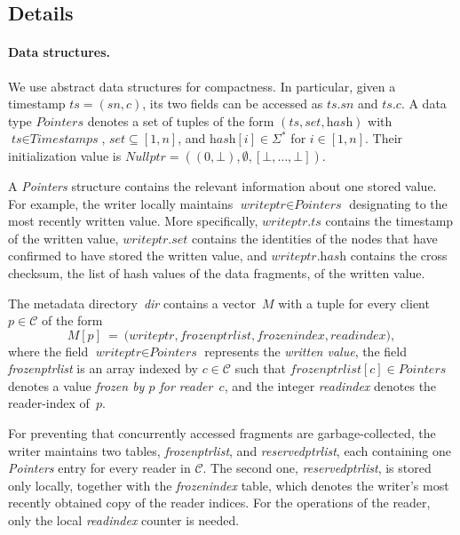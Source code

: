 \documentclass[oribibl]{llncs}
\theoremstyle{definition-boldhead}
\newcommand{\var}[1]{\textit{#1}}
\newcommand{\clientset}{\ensuremath{\mathcal{C}}\xspace}
\newcommand{\strings}{\ensuremath{\Sigma^{*}}}
\newcommand{\nodes}{nodes\xspace}
\begin{document}
\subsection{Details}
\label{sec:details}

\paragraph{Data structures.}
We use abstract data structures for compactness.  In particular, given
a timestamp $\var{ts} = (\var{sn}, c)$, its two fields can be accessed
as $\var{ts}.\var{sn}$ and $\var{ts}.c$.  A data type $\var{Pointers}$
denotes a set of tuples of the form $(\var{ts}, \var{set},
\var{hash})$ with $\var{ts} \in \var{Timestamps}$, $\var{set}
\subseteq [1,n]$, and $\var{hash}[i] \in \strings$ for $i \in [1,n]$.
Their initialization value is $\var{Nullptr} = ((0, \bot), \emptyset,
[\bot, \dots, \bot])$.

A \var{Pointers} structure contains the relevant information about one
stored value.  For example, the writer locally maintains
$\var{writeptr} \in \var{Pointers}$ designating to the most recently
written value.  More specifically, $\var{writeptr}.\var{ts}$ contains
the timestamp of the written value, $\var{writeptr}.\var{set}$
contains the identities of the \nodes that have confirmed to have
stored the written value, and $\var{writeptr}.\var{hash}$ contains the
cross checksum, the list of hash values of the data fragments, of
the written value.


The metadata directory~\var{dir} contains a vector~$M$ with a tuple
for every client~$p \in \clientset$ of the form
\[
  M[p] \ = \
  \bigl(
    \var{writeptr}, \var{frozenptrlist}, \var{frozenindex}, \var{readindex}
  \bigr),
\]
where the field $\var{writeptr} \in \var{Pointers}$ represents the
\emph{written value}, the field \var{frozenptrlist} is an array
indexed by $c \in \clientset$ such that $\var{frozenptrlist}[c] \in
\var{Pointers}$ denotes a value \emph{frozen by $p$ for reader~$c$},
and the integer \var{readindex} denotes the reader-index of~$p$.

For preventing that concurrently accessed fragments are
garbage-collected, the writer maintains two tables,
\var{frozenptrlist}, and \var{reservedptrlist}, each containing one
\var{Pointers} entry for every reader in \clientset.  The second one,
\var{reservedptrlist}, is stored only locally, together with the
\var{frozenindex} table, which denotes the writer's most recently
obtained copy of the reader indices.  For the operations of the
reader, only the local \var{readindex} counter is needed.
\end{document}
